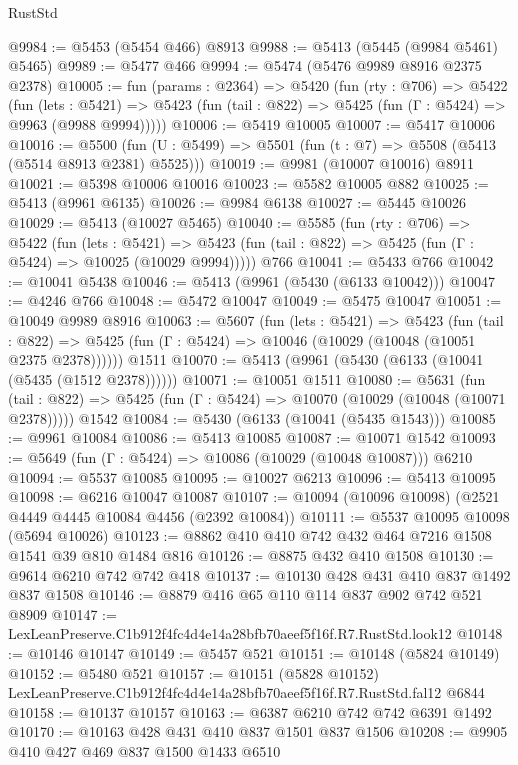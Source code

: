 \begin{lexlean}{RustStd}
\begin{coremodule}
@9984 := @5453 (@5454 @466) @8913
@9988 := @5413 (@5445 (@9984 @5461) @5465)
@9989 := @5477 @466
@9994 := @5474 (@5476 @9989 @8916 @2375 @2378)
@10005 := fun (params : @2364) =>
  @5420
    (fun (rty : @706) =>
    @5422
      (fun (lets : @5421) =>
      @5423 (fun (tail : @822) => @5425 (fun (Γ : @5424) => @9963 (@9988 @9994)))))
@10006 := @5419 @10005
@10007 := @5417 @10006
@10016 := @5500 (fun (U : @5499) => @5501 (fun (t : @7) => @5508 (@5413 (@5514 @8913 @2381) @5525)))
@10019 := @9981 (@10007 @10016) @8911
@10021 := @5398 @10006 @10016
@10023 := @5582 @10005 @882
@10025 := @5413 (@9961 @6135)
@10026 := @9984 @6138
@10027 := @5445 @10026
@10029 := @5413 (@10027 @5465)
@10040 := @5585
    (fun (rty : @706) =>
    @5422
      (fun (lets : @5421) =>
      @5423 (fun (tail : @822) => @5425 (fun (Γ : @5424) => @10025 (@10029 @9994)))))
    @766
@10041 := @5433 @766
@10042 := @10041 @5438
@10046 := @5413 (@9961 (@5430 (@6133 @10042)))
@10047 := @4246 @766
@10048 := @5472 @10047
@10049 := @5475 @10047
@10051 := @10049 @9989 @8916
@10063 := @5607
    (fun (lets : @5421) =>
    @5423
      (fun (tail : @822) =>
      @5425 (fun (Γ : @5424) => @10046 (@10029 (@10048 (@10051 @2375 @2378))))))
    @1511
@10070 := @5413 (@9961 (@5430 (@6133 (@10041 (@5435 (@1512 @2378))))))
@10071 := @10051 @1511
@10080 := @5631
    (fun (tail : @822) => @5425 (fun (Γ : @5424) => @10070 (@10029 (@10048 (@10071 @2378)))))
    @1542
@10084 := @5430 (@6133 (@10041 (@5435 @1543)))
@10085 := @9961 @10084
@10086 := @5413 @10085
@10087 := @10071 @1542
@10093 := @5649 (fun (Γ : @5424) => @10086 (@10029 (@10048 @10087))) @6210
@10094 := @5537 @10085
@10095 := @10027 @6213
@10096 := @5413 @10095
@10098 := @6216 @10047 @10087
@10107 := @10094 (@10096 @10098) (@2521 @4449 @4445 @10084 @4456 (@2392 @10084))
@10111 := @5537 @10095 @10098 (@5694 @10026)
@10123 := @8862 @410 @410 @742 @432 @464 @7216 @1508 @1541 @39 @810 @1484 @816
@10126 := @8875 @432 @410 @1508
@10130 := @9614 @6210 @742 @742 @418
@10137 := @10130 @428 @431 @410 @837 @1492 @837 @1508
@10146 := @8879 @416 @65 @110 @114 @837 @902 @742 @521 @8909
@10147 := LexLeanPreserve.C1b912f4fc4d4e14a28bfb70aeef5f16f.R7.RustStd.look12
@10148 := @10146 @10147
@10149 := @5457 @521
@10151 := @10148 (@5824 @10149)
@10152 := @5480 @521
@10157 := @10151
    (@5828 @10152)
    LexLeanPreserve.C1b912f4fc4d4e14a28bfb70aeef5f16f.R7.RustStd.fal12
    @6844
@10158 := @10137 @10157
@10163 := @6387 @6210 @742 @742 @6391 @1492
@10170 := @10163 @428 @431 @410 @837 @1501 @837 @1506
@10208 := @9905
    @410
    @427
    @469
    @837
    @1500
    @1433
    @6510

\end{coremodule}
\end{lexlean}

